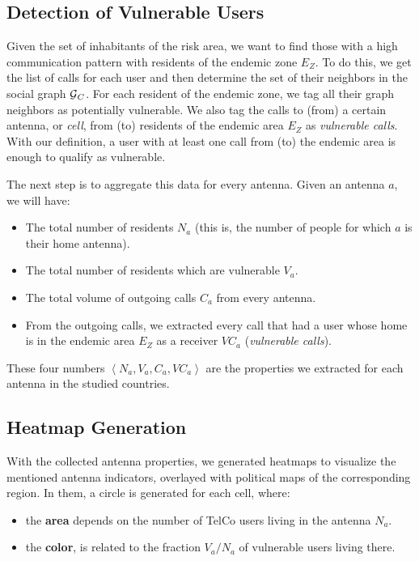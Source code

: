 \subsection{Detection of Vulnerable Users}\label{subsection:vulnerable_users_detection}

Given the set of inhabitants of the risk area, we want to find those with a high communication pattern with residents of the endemic zone $E_Z$.
To do this, we get the list of calls for each user and then determine the set of their neighbors in the social graph $\operatorname{\mathcal{G}}_C$.
For each resident of the endemic zone, we tag all their graph neighbors as potentially vulnerable.
We also tag the calls to (from) a certain antenna, or \textit{cell}, from (to) residents of the endemic area $E_Z$ as \textit{vulnerable calls}.
With our definition, a user with at least one call from (to) the endemic area is enough to qualify as vulnerable.

The next step is to aggregate this data for every antenna.
Given an antenna $a$, we will have:
\begin{itemize}
	\item The total number of residents $N_a$ (this is, the number of people for which $a$ is their home antenna).
	\item The total number of residents which are vulnerable $V_a$.
	\item The total volume of outgoing calls $C_a$ from every antenna.
	\item From the outgoing calls, we extracted every call that had a user whose home is in the endemic area $E_Z$ as a receiver $VC_a$ (\textit{vulnerable calls}).
\end{itemize}

These four numbers $\left< N_a, V_a, C_a, VC_a \right>$ are the properties we extracted for each antenna in the studied countries.

\subsection{Heatmap Generation}
With the collected antenna properties, we generated heatmaps to visualize the mentioned antenna indicators, overlayed with political maps of the corresponding region.
In them, a circle is generated for each cell, where:

\begin{itemize}
	\item the \textbf{area} depends on the number of TelCo users living in the antenna $N_a$.

	\item the \textbf{color}, is related to the fraction ${V_a}/{N_a}$ of vulnerable users living there.
\end{itemize}


